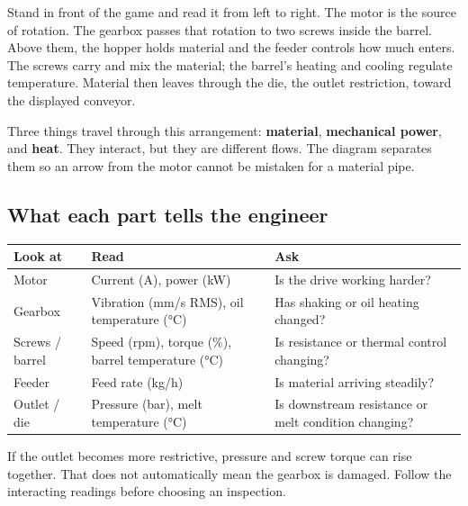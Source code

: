 Stand in front of the game and read it from left to right. The motor is the source of rotation. The gearbox passes that rotation to two screws inside the barrel. Above them, the hopper holds material and the feeder controls how much enters. The screws carry and mix the material; the barrel's heating and cooling regulate temperature. Material then leaves through the die, the outlet restriction, toward the displayed conveyor.

Three things travel through this arrangement: \textbf{material}, \textbf{mechanical power}, and \textbf{heat}. They interact, but they are different flows. The diagram separates them so an arrow from the motor cannot be mistaken for a material pipe.

\subsection*{What each part tells the engineer}
\begin{tabularx}{\linewidth}{@{}p{.19\linewidth}p{.24\linewidth}X@{}}\toprule
Look at & Read & Ask\\\midrule
Motor & Current (A), power (kW) & Is the drive working harder?\\
Gearbox & Vibration (mm/s RMS), oil temperature (°C) & Has shaking or oil heating changed?\\
Screws / barrel & Speed (rpm), torque (\%), barrel temperature (°C) & Is resistance or thermal control changing?\\
Feeder & Feed rate (kg/h) & Is material arriving steadily?\\
Outlet / die & Pressure (bar), melt temperature (°C) & Is downstream resistance or melt condition changing?\\\bottomrule
\end{tabularx}

If the outlet becomes more restrictive, pressure and screw torque can rise together. That does not automatically mean the gearbox is damaged. Follow the interacting readings before choosing an inspection.

